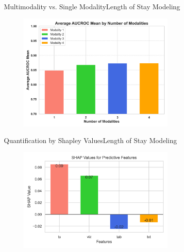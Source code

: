 \documentclass{sintefbeamer}
\theoremstyle{definition}
\begin{document}
\begin{frame}{Multimodality vs. Single Modality}{Length of Stay Modeling}


\begin{figure}[htbp]
  \centering
  \includegraphics[width=0.7\textwidth]{images/average_auc_by_modalities.png}
  \label{fig:ex1}	
\end{figure}
\end{frame}

%
%
%


\begin{frame}{Quantification by Shapley Values}{Length of Stay Modeling}
\begin{figure}[htbp]
  \centering
  \includegraphics[width=0.7\textwidth]{images/shap_value_los.png}
  \label{fig:ex1}	
\end{figure}
\end{frame}
\backmatter
\end{document}
